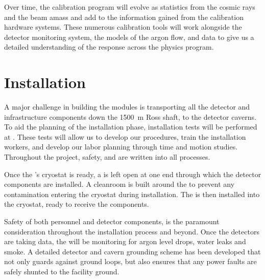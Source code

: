 Over time, the  calibration program will evolve as statistics from the cosmic rays and the  beam amass and add to the information gained from the calibration hardware systems. These numerous calibration tools will work alongside the detector monitoring system, the  models of the argon flow, and  data to give us a detailed understanding of the  response across the  physics program.


\section{Installation}

A major challenge in building the   modules is transporting all the detector and infrastructure components down the \SI{1500}{\meter} Ross shaft, to the detector caverns. To aid the planning of the installation phase, installation tests will be performed at . These tests will allow us to develop our procedures, train the installation workers, and develop our labor planning through time and motion studies. Throughout the project, safety,  and  are written into all processes.

Once the 's cryostat is ready, %
a  is left open at one end through which the detector components are installed. A cleanroom is built around the  to prevent any contamination entering the cryostat during installation. The  is then installed into the cryostat, ready to receive the  components. 


Safety of both personnel and  detector components, is the paramount consideration throughout the installation process and beyond. Once the detectors are taking data, %
the  will be monitoring for argon level drops, water leaks and smoke. A detailed detector and cavern grounding scheme has been developed that not only guards against ground loops, but also ensures that any power faults are safely shunted to the facility ground.



